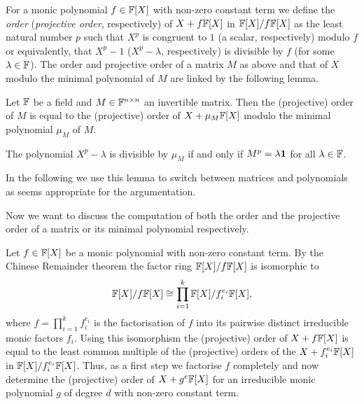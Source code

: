 For a monic polynomial $f \in \mathbb{F}[X]$ with non-zero constant term
we define the \emph{order} (\emph{projective order}, respectively) of 
$X + f\mathbb{F}[X]$ in $\mathbb{F}[X]/f\mathbb{F}[X]$ as the least natural 
number $p$ such that $X^p$ is congruent 
to $1$ (a scalar, respectively) modulo $f$ or equivalently, that $X^p-1$ 
($X^p-\lambda$, respectively) is
divisible by $f$ (for some $\lambda \in \mathbb{F}$). 
The order and projective order
of a matrix $M$ as above and that of $X$ modulo the minimal polynomial 
of $M$ are linked by the following lemma.

\enlargethispage{1\baselineskip}
\begin{Lemm}
Let\/ $\mathbb{F}$ be a field and $M \in \mathbb{F}^{n \times n}$ an invertible matrix.
Then the (projective) order of $M$ is equal to the (projective) order of
$X + \mu_M \mathbb{F}[X]$ modulo the minimal polynomial $\mu_M$ of $M$.
\end{Lemm}
\proofbeg 
The polynomial $X^p-\lambda$ is divisible by $\mu_M$ if and
only if $M^p = \lambda \mathbf{1}$ for all $\lambda \in \mathbb{F}$.
\proofend

In the following we use this lemma to switch between matrices and
polynomials as seems appropriate for the argumentation.

Now we want to discuss the computation of both the order and the
projective order of a matrix or its minimal polynomial respectively.

Let $f \in \mathbb{F}[X]$ be a monic polynomial with non-zero constant term. 
By the Chinese Remainder theorem the factor ring
$\mathbb{F}[X]/f\mathbb{F}[X]$ is isomorphic to
\[ \mathbb{F}[X]/f\mathbb{F}[X] \cong
   \prod_{i=1}^k \mathbb{F}[X]/f_i^{e_i} \mathbb{F}[X], \]
where $f = \prod_{i=1}^k f_i^{e_i}$ is the factorisation of $f$ into
its pairwise distinct irreducible monic factors $f_i$. Using this
isomorphism the (projective) order of $X+f\mathbb{F}[X]$ is equal to the least 
common multiple of the (projective) orders of the $X + f_i^{e_i}
\mathbb{F}[X]$ in $\mathbb{F}[X]/f_i^{e_i}\mathbb{F}[X]$. Thus, as a first step we factorise
$f$ completely and now determine the (projective) order of
$X+g^e\mathbb{F}[X]$ for an irreducible monic polynomial $g$ of degree $d$ 
with non-zero constant term.

